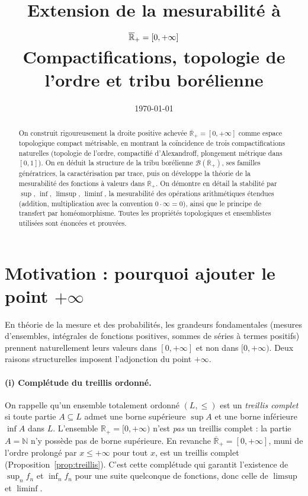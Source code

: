 \documentclass[11pt,a4paper]{article}
\title{\textbf{Extension de la mesurabilité à $\Rpb=[0,+\infty]$}\\[4pt]
\large Compactifications, topologie de l'ordre et tribu borélienne}
\author{}
\date{\today}
\theoremstyle{plain}
\theoremstyle{definition}
\newcommand{\N}{\mathbb{N}}
\newcommand{\Rp}{\mathbb{R}_+}
\newcommand{\Rpb}{\overline{\mathbb{R}}_+}
\newcommand{\B}{\mathcal{B}}
\begin{document}
\maketitle

\begin{abstract}
On construit rigoureusement la droite positive achevée $\Rpb=[0,+\infty]$ comme
espace topologique compact métrisable, en montrant la coïncidence de trois
compactifications naturelles (topologie de l'ordre, compactifié d'Alexandroff,
plongement métrique dans $[0,1]$). On en déduit la structure de la tribu
borélienne $\B(\Rpb)$, ses familles génératrices, la caractérisation par trace,
puis on développe la théorie de la mesurabilité des fonctions à valeurs dans
$\Rpb$. On démontre en détail la stabilité par $\sup$, $\inf$, $\limsup$,
$\liminf$, la mesurabilité des opérations arithmétiques étendues (addition,
multiplication avec la convention $0\cdot\infty=0$), ainsi que le principe de
transfert par homéomorphisme. Toutes les propriétés topologiques et
ensemblistes utilisées sont énoncées et prouvées.
\end{abstract}

\tableofcontents

\section{Motivation : pourquoi ajouter le point $+\infty$}

En théorie de la mesure et des probabilités, les grandeurs fondamentales
(mesures d'ensembles, intégrales de fonctions positives, sommes de séries à
termes positifs) prennent naturellement leurs valeurs dans $[0,+\infty]$ et non
dans $[0,+\infty)$. Deux raisons structurelles imposent l'adjonction du point
$+\infty$.

\paragraph{(i) Complétude du treillis ordonné.}
On rappelle qu'un ensemble totalement ordonné $(L,\le)$ est un \emph{treillis
complet} si toute partie $A\subseteq L$ admet une borne supérieure $\sup A$ et
une borne inférieure $\inf A$ dans $L$. L'ensemble $\Rp=[0,+\infty)$ n'est
\emph{pas} un treillis complet : la partie $A=\N$ n'y possède pas de borne
supérieure. En revanche $\Rpb=[0,+\infty]$, muni de l'ordre prolongé par
$x\le+\infty$ pour tout $x$, est un treillis complet (Proposition~\ref{prop:treillis}).
C'est cette complétude qui garantit l'existence de $\sup_n f_n$ et
$\inf_n f_n$ pour une suite quelconque de fonctions, donc celle de
$\limsup$ et $\liminf$.
\end{document}
